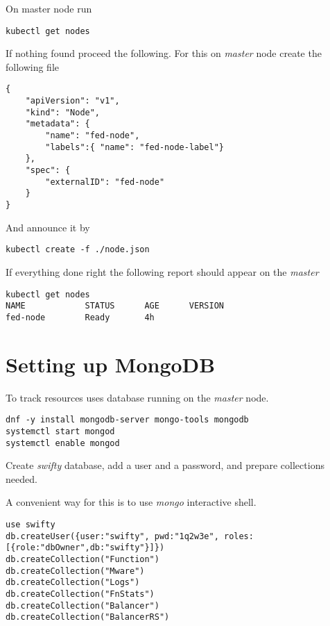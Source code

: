 On master node run

\begin{lstlisting}
kubectl get nodes
\end{lstlisting}

If nothing found proceed the following. For this on
\emph{master} node create the following 
file

\begin{lstlisting}
{
    "apiVersion": "v1",
    "kind": "Node",
    "metadata": {
        "name": "fed-node",
        "labels":{ "name": "fed-node-label"}
    },
    "spec": {
        "externalID": "fed-node"
    }
}
\end{lstlisting}

And announce it by
\begin{lstlisting}
kubectl create -f ./node.json
\end{lstlisting}

If everything done right the following report should
appear on the \emph{master} 

\begin{lstlisting}
kubectl get nodes
NAME            STATUS      AGE      VERSION
fed-node        Ready       4h
\end{lstlisting}

\section{Setting up MongoDB}
\label{sec:setup-mongodb}

To track resources  uses
 database
running on the \emph{master} node.

\begin{lstlisting}
dnf -y install mongodb-server mongo-tools mongodb
systemctl start mongod
systemctl enable mongod
\end{lstlisting}

Create \emph{swifty} database, add a user and a password,
and prepare collections needed.

A convenient way for this is to use \emph{mongo} interactive shell.

\begin{lstlisting}
use swifty
db.createUser({user:"swifty", pwd:"1q2w3e", roles:[{role:"dbOwner",db:"swifty"}]})
db.createCollection("Function")
db.createCollection("Mware")
db.createCollection("Logs")
db.createCollection("FnStats")
db.createCollection("Balancer")
db.createCollection("BalancerRS")
\end{lstlisting}

